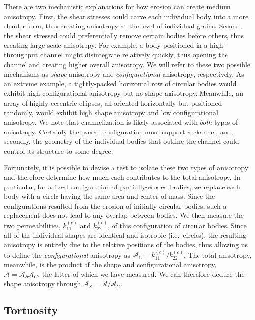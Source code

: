 \documentclass[3p]{elsarticle}
\newcommand{\anis}{\mathcal{A}}
\begin{document}
There are two mechanistic explanations for how erosion can create medium anisotropy. First, the shear stresses could carve each individual body into a more slender form, thus creating anisotropy at the level of individual grains. Second, the shear stressed could preferentially remove certain bodies before others, thus creating large-scale anisotropy. For example, a body positioned in a high-throughput channel might disintegrate relatively quickly, thus opening the channel and creating higher overall anisotropy. We will refer to these two possible mechanisms as {\em shape} anisotropy and {\em configurational} anisotropy, respectively. As an extreme example, a tightly-packed horizontal row of circular bodies would exhibit high configurational anisotropy but no shape anisotropy. Meanwhile, an array of highly eccentric ellipses, all oriented horizontally but positioned randomly, would exhibit high shape anisotropy and low configurational anisotropy. We note that channelization is likely associated with {\em both} types of anisotropy. Certainly the overall configuration must support a channel, and, secondly, the geometry of the individual bodies that outline the channel could control its structure to some degree.

Fortunately, it is possible to devise a test to isolate these two types of anisotropy and therefore determine how much each contributes to the total anisotropy. In particular, for a fixed configuration of partially-eroded bodies, we replace each body with a circle having the same area and center of mass. Since the configurations resulted from the erosion of initially circular bodies, such a replacement does not lead to any overlap between bodies. We then measure the two permeabilities, $k_{11}^{(c)}$ and $ k_{22}^{(c)}$, of this configuration of circular bodies. Since all of the individual shapes are identical and isotropic (i.e.~circles), the resulting anisotropy is entirely due to the relative positions of the bodies, thus allowing us to define the {\em configurational} anisotropy as $\anis_C = k_{11}^{(c)} / k_{22}^{(c)}$. The total anisotropy, meanwhile, is the product of the shape and configurational anisotropy, $\anis = \anis_S \anis_C$, the latter of which we have measured. We can therefore deduce the shape anisotropy through $\anis_S = \anis/\anis_C$.

\subsection{Tortuosity}
%
\end{document}
